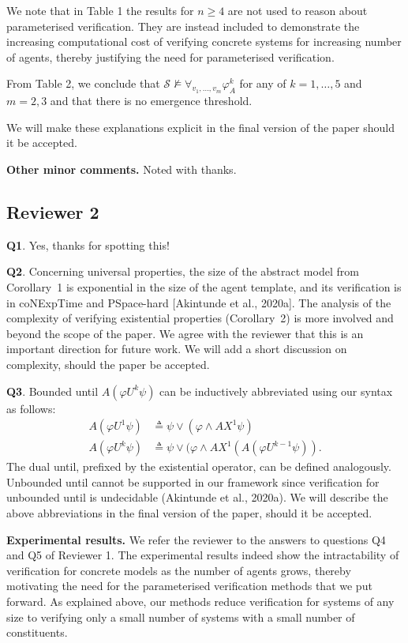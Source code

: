 \documentclass{article}
\begin{document}
We note that in Table 1 the results for $n\geq 4$ are not used to reason about
parameterised verification. They are instead  included to demonstrate the
increasing computational cost of verifying concrete systems for increasing
number of agents, thereby justifying the need for parameterised verification. 

From Table 2, we conclude that
$\mathcal{S}\not\models\forall_{v_1,\dots,v_m}\varphi^k_A$ for any of
$k=1,\dots,5$ and $m=2,3$ and that there is no emergence threshold.

We will make these explanations explicit in the final
version of the paper should it be accepted.

\noindent
\textbf{Other minor comments.} Noted with thanks.


\subsection*{Reviewer 2}

\textbf{Q1}. Yes, thanks for spotting this!

\noindent
\textbf{Q2}.  
Concerning universal properties, the size of the abstract model from
Corollary~1  is exponential in the size of the agent template, and its
verification is in {\sc coNExpTime} and {\sc PSpace-hard} [Akintunde et al.,
2020a]. The analysis of the complexity of verifying existential properties
(Corollary~2) is more involved and beyond the scope of the paper. We agree with
the reviewer  that this is an important direction for future work.  
We will add a short discussion on complexity, should the
paper be accepted.

\noindent
\textbf{Q3}. Bounded until $A(\varphi U^k \psi)$ can be inductively abbreviated
using our syntax as follows:
 \begin{align*}
  A(\varphi U^1 \psi) &\triangleq \psi \lor (\varphi \land AX^1 \psi) \\
  A(\varphi U^k \psi) &\triangleq \psi \lor (\varphi \land AX^1 (A (\varphi U^{k-1} \psi)).
 \end{align*}
The dual until, prefixed by the existential operator, can be defined
analogously. Unbounded until cannot be supported in our framework since
verification for unbounded until is undecidable (Akintunde et al., 2020a). We
will describe the above abbreviations in the final version of  the paper,
should it be accepted.

\noindent
\textbf{Experimental results.} We refer the reviewer to the answers to 
questions Q4 and Q5 of Reviewer 1. The experimental results indeed show  the
intractability of verification for concrete models as the number of agents
grows, thereby motivating the need for the parameterised verification methods
that we put forward. As explained above, our methods reduce verification for
systems of any size to verifying only a small number of systems with a small
number of constituents.  
\end{document}
